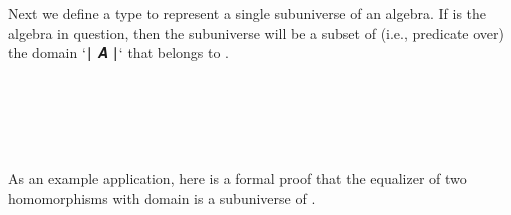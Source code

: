 Next we define a type to represent a single subuniverse of an algebra. If  is the algebra in question, then the subuniverse will be a subset of (i.e., predicate over) the domain  `∣ 𝑨 ∣` that belongs to  .
\ccpad
\begin{code}%
\>[0][@{}l@{\AgdaIndent{1}}]%
\>[1]\AgdaSpace{}%
\AgdaSpace{}%
\AgdaSymbol{\{}\AgdaSpace{}%
\AgdaSymbol{:}\AgdaSpace{}%
\AgdaSpace{}%
\AgdaSpace{}%
\AgdaSymbol{\}}\AgdaSpace{}%
\AgdaSymbol{:}\AgdaSpace{}%
\AgdaSpace{}%
\AgdaSymbol{(}\AgdaSpace{}%
\AgdaSpace{}%
\AgdaSymbol{)}\AgdaSpace{}%
\AgdaSpace{}%
\<%
\\
\>[1][@{}l@{\AgdaIndent{0}}]%
\>[2]\AgdaSpace{}%
\<%
\\
%
\>[2]\<%
\\
\>[2][@{}l@{\AgdaIndent{0}}]%
\>[4]%
\>[10]\AgdaSymbol{:}\AgdaSpace{}%
\AgdaSpace{}%
\AgdaSpace{}%
\AgdaSpace{}%
\AgdaSpace{}%
\<%
\\
%
\>[4]\AgdaSpace{}%
\AgdaSymbol{:}\AgdaSpace{}%
\AgdaSpace{}%
\AgdaSpace{}%
\AgdaSpace{}%
\<%
\end{code}
\ccpad
As an example application, here is a formal proof that the equalizer of two homomorphisms with domain  is a subuniverse of .
\ccpad
